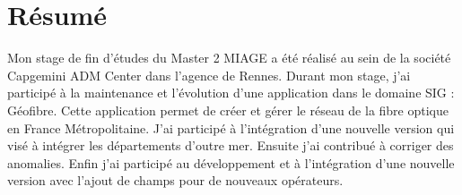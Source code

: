 \chapter*{Résumé}

Mon stage de fin d'études du Master 2 MIAGE a été réalisé au sein de la société Capgemini ADM Center dans l'agence de Rennes.
\newline
Durant mon stage, j'ai participé à la maintenance et l'évolution d'une application dans le domaine SIG : Géofibre. Cette application permet
de créer et gérer le réseau de la fibre optique en France Métropolitaine.
 \newline
 J'ai participé à l'intégration d'une nouvelle version qui visé à intégrer les départements d'outre mer. Ensuite j'ai contribué à corriger des anomalies. 
 Enfin j'ai participé au développement et à l'intégration d'une nouvelle version avec l'ajout de champs pour de nouveaux opérateurs.
